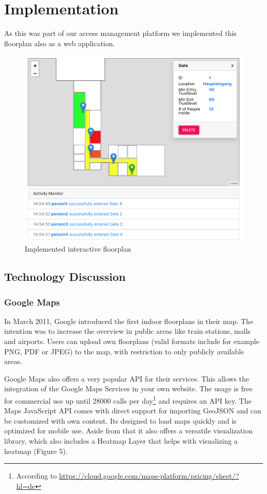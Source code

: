 \section{Implementation}
As this was part of our access management platform we implemented this floorplan also as a web application.

\begin{figure}[!hb]
	\centering
	\includegraphics[width=0.9\linewidth]{images/FloorplanScreenshot}
	\caption{Implemented interactive floorplan}
	\label{fig:FloorplanScreenshot}
\end{figure}

\subsection{Technology Discussion}

\subsubsection{Google Maps}
\label{Google Maps}

In March 2011, Google introduced the first indoor floorplans in their map. The intention was to increase the overview in public areas like train stations, malls and airports.
Users can upload own floorplans (valid formats include for example PNG, PDF or JPEG) to the map, with restriction to only publicly available areas.

Google Maps also offers a very popular API for their services. This allows the integration of the Google Maps Services in your own website. The usage is free for commercial use up until 28000 calls per day\footnote{According to \url{https://cloud.google.com/maps-platform/pricing/sheet/?hl=de}} and requires an API key.
The Maps JavaScript API comes with direct support for importing GeoJSON and can be customized with own content. Its designed to load maps quickly and is optimized for mobile use. Aside from that it also offers a versatile visualization library, which also includes a Heatmap Layer that helps with visualizing a heatmap (Figure 5).

